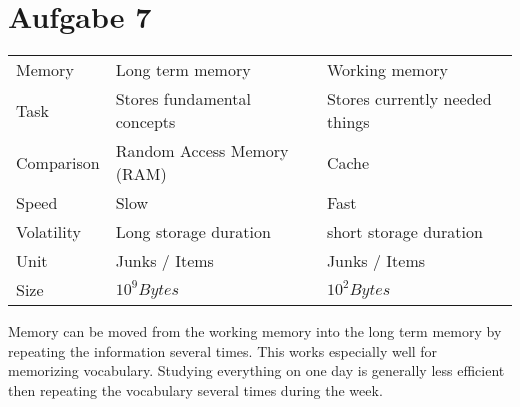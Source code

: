 \documentclass{article}
\begin{document}
\section*{Aufgabe 7}
\begin{table}[H]
    \centering
    \begin{tabular}{lll}
	\toprule
	Memory & Long term memory & Working memory \\
	Task & Stores fundamental concepts & Stores currently needed things \\ \midrule
	Comparison & Random Access Memory (RAM) & Cache \\
	Speed & Slow & Fast \\
	Volatility & Long storage duration & short storage duration \\
	Unit & Junks / Items & Junks / Items \\
	Size & \( 10 ^{9} Bytes\) & \( 10 ^{2} Bytes \) \\
	\bottomrule
    \end{tabular}
\end{table}
Memory can be moved from the working memory into the long term memory by
repeating the information several times. This works especially well for
memorizing vocabulary. Studying everything on one day is generally less efficient
then repeating the vocabulary several times during the week.
\end{document}

